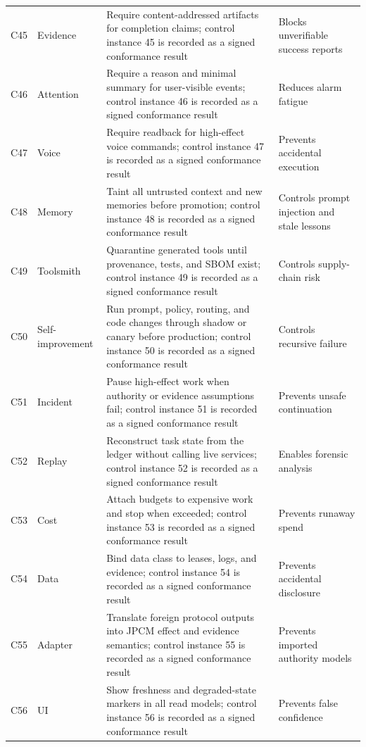 \documentclass[10pt,journal,onecolumn]{IEEEtran}
\begin{document}
\begin{longtable}{P{0.06\textwidth} P{0.14\textwidth} P{0.48\textwidth} P{0.24\textwidth}}
C45 & Evidence & Require content-addressed artifacts for completion claims; control instance 45 is recorded as a signed conformance result & Blocks unverifiable success reports \\
C46 & Attention & Require a reason and minimal summary for user-visible events; control instance 46 is recorded as a signed conformance result & Reduces alarm fatigue \\
C47 & Voice & Require readback for high-effect voice commands; control instance 47 is recorded as a signed conformance result & Prevents accidental execution \\
C48 & Memory & Taint all untrusted context and new memories before promotion; control instance 48 is recorded as a signed conformance result & Controls prompt injection and stale lessons \\
C49 & Toolsmith & Quarantine generated tools until provenance, tests, and SBOM exist; control instance 49 is recorded as a signed conformance result & Controls supply-chain risk \\
C50 & Self-improvement & Run prompt, policy, routing, and code changes through shadow or canary before production; control instance 50 is recorded as a signed conformance result & Controls recursive failure \\
C51 & Incident & Pause high-effect work when authority or evidence assumptions fail; control instance 51 is recorded as a signed conformance result & Prevents unsafe continuation \\
C52 & Replay & Reconstruct task state from the ledger without calling live services; control instance 52 is recorded as a signed conformance result & Enables forensic analysis \\
C53 & Cost & Attach budgets to expensive work and stop when exceeded; control instance 53 is recorded as a signed conformance result & Prevents runaway spend \\
C54 & Data & Bind data class to leases, logs, and evidence; control instance 54 is recorded as a signed conformance result & Prevents accidental disclosure \\
C55 & Adapter & Translate foreign protocol outputs into JPCM effect and evidence semantics; control instance 55 is recorded as a signed conformance result & Prevents imported authority models \\
C56 & UI & Show freshness and degraded-state markers in all read models; control instance 56 is recorded as a signed conformance result & Prevents false confidence \\

\end{longtable}
\end{document}
